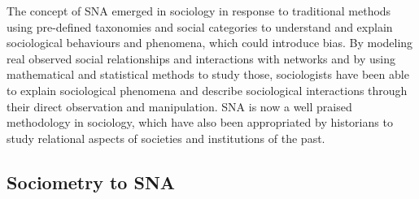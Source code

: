 The concept of SNA emerged in sociology in response to traditional methods using pre-defined taxonomies and social categories to understand and explain sociological behaviours and phenomena, which could introduce bias.
By modeling real observed social relationships and interactions with networks and by using mathematical and statistical methods to study those, sociologists have been able to explain sociological phenomena and describe sociological interactions through their direct observation and manipulation.
SNA is now a well praised methodology in sociology, which have also been appropriated by historians to study relational aspects of societies and institutions of the past.

\subsection{Sociometry to SNA}

